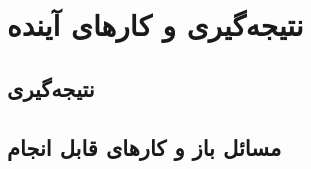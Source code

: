 \chapter{نتیجه‌گیری و کار‌های آینده}
\thispagestyle{empty}

\section{نتیجه‌گیری}

\section{مسائل باز و کارهای قابل انجام}
